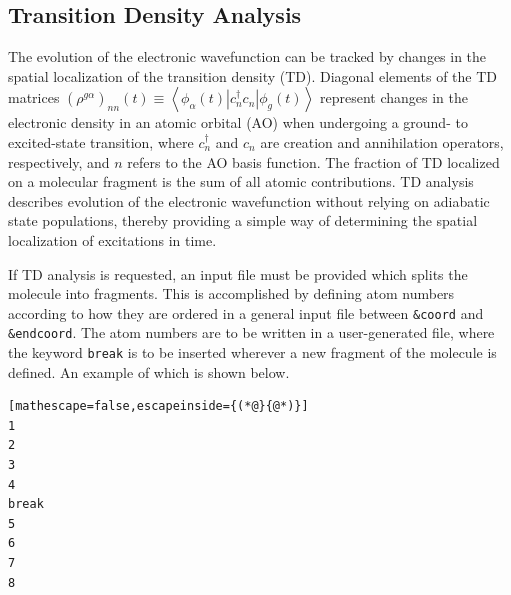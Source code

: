 \documentclass[letterpaper,12pt,titlepage]{article}
\begin{document}
\newpage
\subsection{Transition Density Analysis}
The evolution of the electronic wavefunction can be tracked by changes in the spatial localization of the transition density (TD).  Diagonal elements of the TD matrices $\left(\rho^{g\alpha}\right)_{nn}\left(t\right)\equiv\left<\phi_{\alpha}\left(t\right)|c_{n}^{\dagger}c_{n}|\phi_{g}\left(t\right)\right>$ represent changes in the electronic density in an atomic orbital (AO) when undergoing a ground- to excited-state transition, where $c_{n}^{\dagger}$ and $c_{n}$ are creation and annihilation operators, respectively, and $n$ refers to the AO basis function.\cite{wu2006exciton}  The fraction of TD localized on a molecular fragment is the sum of all atomic contributions.\cite{baer2006beyond}  TD analysis describes evolution of the electronic wavefunction without relying on adiabatic state populations, thereby providing a simple way of determining the spatial localization of excitations in time.\cite{fernandez2012identification,fernandez2012shishiodoshi,nelson2013conformational}  

If TD analysis is requested, an input file must be provided which splits the molecule into fragments.   This is accomplished by defining atom numbers according to how they are ordered in a general input file between \verb+&coord+ and \verb+&endcoord+.  The atom numbers are to be written in a user-generated file, where the keyword \verb+break+ is to be inserted wherever a new fragment of the molecule is defined.  An example of which is shown below.
\begin{lstlisting}[mathescape=false,escapeinside={(*@}{@*)}]
1
2
3
4
break
5
6
7
8
\end{lstlisting}
\end{document}
